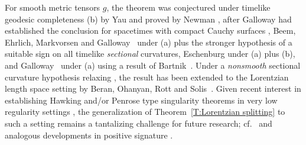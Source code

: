 \documentclass[12pt]{amsart}
\newcommand{\orange}{\color{orange}}
\begin{document}
For smooth metric tensors $g$, the theorem was conjectured under {timelike geodesic completeness} 
(b) by Yau \cite{Yau82} and proved by Newman \cite{Newman90},
after Galloway had established the conclusion for spacetimes with compact Cauchy surfaces \cite{Galloway84},
Beem, Ehrlich, Markvorsen and 
Galloway~\cite{BeemEhrlichMarkvorsenGalloway84}
under (a) plus the stronger hypothesis of a suitable sign on all timelike {\em sectional} curvatures,  Eschenburg \cite{Eschenburg88} under (a) plus (b),  and 
Galloway~\cite{Galloway89} under (a) using a result of Bartnik~\cite{Bartnik88b}.  
Under a {\em nonsmooth} sectional curvature hypothesis relaxing \cite{BeemEhrlichMarkvorsenGalloway84}, the result has been extended to the Lorentzian length space \cite{KunzingerSaemann18} setting
by Beran, Ohanyan, Rott and Solis~\cite{BeranOhanyanRottSolis23}. Given recent interest in establishing Hawking and/or Penrose type singularity theorems
in very low regularity settings \cite{KunzingerSteinbauerStojkovicVickers2015,KunzingerSteinbauerVickers15,GrafGrantKunzingerSteinbauer18,Graf20,KunzingerOhanyanSchinnerlSteinbauer2022,AlexanderGrafKunzingerSaemann19+,CavallettiMondino20+},
 the generalization of Theorem~\ref{T:Lorentzian splitting} to such a setting remains a tantalizing challenge 
for future research; cf.~\cite{BeranOctet24+} and analogous developments in positive signature \cite{Gigli26,Gigli14,Gigli15}.
\end{document}
